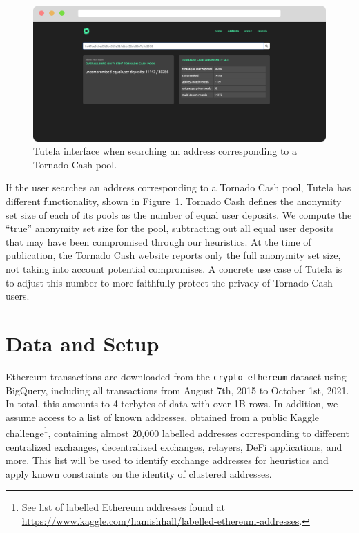 \documentclass[11pt,a4paper]{article}
\begin{document}
\begin{figure}[h!]
\includegraphics[width=\linewidth]{figures/demo2.pdf}
\caption{Tutela interface when searching an address corresponding to a Tornado Cash pool.}
\label{fig:demo2}
\end{figure}

If the user searches an address corresponding to a Tornado Cash pool, Tutela has different functionality, shown in Figure~\ref{fig:demo2}. Tornado Cash defines the anonymity set size of each of its pools as the number of equal user deposits. We compute the ``true'' anonymity set size for the pool, subtracting out all equal user deposits that may have been compromised through our heuristics. At the time of publication, the Tornado Cash website reports only the full anonymity set size, not taking into account potential compromises. A concrete use case of Tutela is to adjust this number to more faithfully protect the privacy of Tornado Cash users.

\section{Data and Setup}

Ethereum transactions are downloaded from the \texttt{crypto\_ethereum} dataset using BigQuery, including all transactions from August 7th, 2015 to October 1st, 2021.  In total, this amounts to 4 terbytes of data with over 1B rows.
In addition, we assume access to a list of known addresses, obtained from a public Kaggle challenge\footnote{See list of labelled Ethereum addresses found at \url{https://www.kaggle.com/hamishhall/labelled-ethereum-addresses}.}, containing almost 20,000 labelled addresses corresponding to different centralized exchanges, decentralized exchanges, relayers, DeFi applications, and more.
This list will be used to identify exchange addresses for heuristics and apply known constraints on the identity of clustered addresses.
\end{document}
